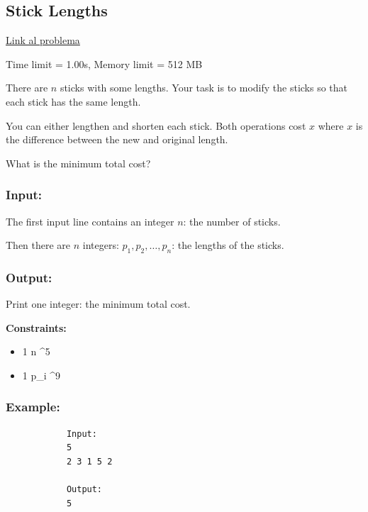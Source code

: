 \newpage


\subsection{Stick Lengths}
\label{problema:brute-force:Sticks-Length}
\href{https://cses.fi/alon/task/1074}{Link al problema} 

\smallskip

\noindent Time limit = 1.00s, Memory limit = 512 MB

\bigskip

	
	There are $n$ sticks with some lengths. Your task is to modify the sticks so that each stick has the same length.
	\medskip
	
	You can either lengthen and shorten each stick. Both operations cost $x$ where $x$ is the difference between the new and original length.
	\medskip
	
	What is the minimum total cost?
		
	\subsubsection*{Input:} 
		
		The first input line contains an integer $n$: the number of sticks.
		
		\medskip  
	Then there are $n$ integers: \(p_1, p_2, \ldots, p_n\): the lengths of the sticks.
	
	
		
	\subsubsection*{Output:}  
		
	Print one integer: the minimum total cost.
		
		\bigskip
		
		\noindent \textbf{Constraints:}
		
		
		\begin{itemize}
			\item 1 \le n  ^{5} 
			\item 1 \le p_i \le 10^{9} 
		\end{itemize}
		
	 
		
		
\subsubsection*{Example:}
		\begin{verbatim}
			Input:
			5
			2 3 1 5 2
			
			Output:
			5
		\end{verbatim}
		
